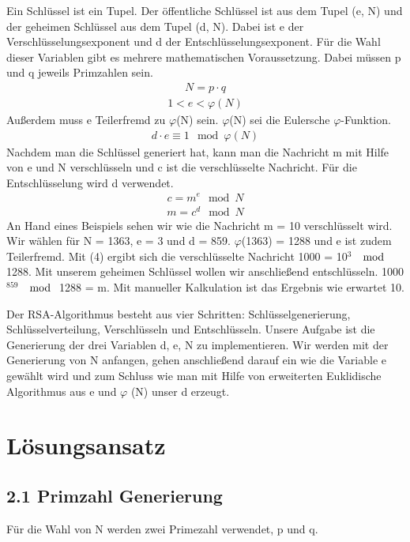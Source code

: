 \documentclass[course=asp]{aspdoc}
\begin{document}
Ein Schlüssel ist ein Tupel. Der öffentliche Schlüssel ist aus dem Tupel (e, N) und der geheimen Schlüssel aus dem Tupel (d, N). Dabei ist e der Verschlüsselungsexponent und d der Entschlüsselungsexponent. Für die Wahl dieser Variablen gibt es mehrere mathematischen Voraussetzung. Dabei müssen p und q jeweils Primzahlen sein.
\begin{align}
 N = p \cdot q
\end{align}
\begin{align}
1 < e < \varphi (N)
\end{align}
Außerdem muss e Teilerfremd zu $\varphi $(N) sein. $\varphi $(N) sei die Eulersche $\varphi $-Funktion.
\begin{align}
d \cdot e \equiv 1 \mod \varphi (N)
\end{align}
Nachdem man die Schlüssel generiert hat, kann man die Nachricht m mit Hilfe von e und N verschlüsseln und c ist die verschlüsselte Nachricht. Für die Entschlüsselung wird d verwendet.
\begin{align}
c {=} m^e \mod N
\end{align} 
\begin{align}
m {=} c^d \mod N
\end{align} 
An Hand eines Beispiels sehen wir wie die Nachricht m = 10 verschlüsselt wird. Wir wählen für N = 1363, e = 3 und d = 859. $\varphi $(1363) = 1288 und e ist zudem Teilerfremd. Mit (4) ergibt sich die verschlüsselte Nachricht 1000 = 10$^{3}$ $\mod $ 1288. Mit unserem geheimen Schlüssel wollen wir anschließend entschlüsseln. 1000$^{859}$ $\mod $ 1288 = m. Mit manueller Kalkulation ist das Ergebnis wie erwartet 10.


Der RSA-Algorithmus besteht aus vier Schritten: Schlüsselgenerierung, Schlüsselverteilung, Verschlüsseln und Entschlüsseln. Unsere Aufgabe ist die Generierung der drei Variablen d, e, N zu implementieren. Wir werden mit der Generierung von N anfangen, gehen anschließend darauf ein wie die Variable e gewählt wird und zum Schluss wie man mit Hilfe von erweiterten Euklidische Algorithmus aus e und $\varphi $ (N) unser d erzeugt.

\section{Lösungsansatz}  
\subsection*{2.1 Primzahl Generierung }
Für die Wahl von N werden zwei Primezahl verwendet, p und q.
\end{document}
